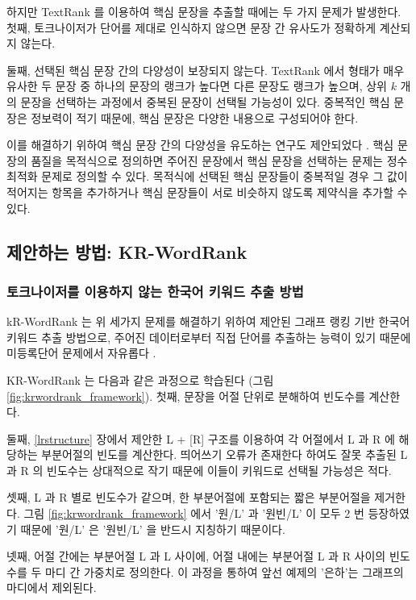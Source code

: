 \documentclass[11pt]{article}
\begin{document}
하지만 TextRank 를 이용하여 핵심 문장을 추출할 때에는 두 가지 문제가 발생한다.
첫째, 토크나이저가 단어를 제대로 인식하지 않으면 문장 간 유사도가 정확하게 계산되지 않는다.

둘째, 선택된 핵심 문장 간의 다양성이 보장되지 않는다.
TextRank 에서 형태가 매우 유사한 두 문장 중 하나의 문장의 랭크가 높다면 다른 문장도 랭크가 높으며, 상위 $k$ 개의 문장을 선택하는 과정에서 중복된 문장이 선택될 가능성이 있다.
중복적인 핵심 문장은 정보력이 적기 때문에, 핵심 문장은 다양한 내용으로 구성되어야 한다.

이를 해결하기 위하여 핵심 문장 간의 다양성을 유도하는 연구도 제안되었다 \citep{mcdonald2007study, parveen2015topical}.
핵심 문장의 품질을 목적식으로 정의하면 주어진 문장에서 핵심 문장을 선택하는 문제는 정수 최적화 문제로 정의할 수 있다.
목적식에 선택된 핵심 문장들이 중복적일 경우 그 값이 적어지는 항목을 추가하거나 핵심 문장들이 서로 비슷하지 않도록 제약식을 추가할 수 있다.


\subsection{제안하는 방법: KR-WordRank}

\subsubsection{토크나이저를 이용하지 않는 한국어 키워드 추출 방법}

kR-WordRank 는 위 세가지 문제를 해결하기 위하여 제안된 그래프 랭킹 기반 한국어 키워드 추출 방법으로, 주어진 데이터로부터 직접 단어를 추출하는 능력이 있기 때문에 미등록단어 문제에서 자유롭다 \citep{kim2014kr}.

KR-WordRank 는 다음과 같은 과정으로 학습된다 (그림 \ref{fig:krwordrank_framework}).
첫째, 문장을 어절 단위로 분해하여 빈도수를 계산한다.

둘째, \ref{lrstructure} 장에서 제안한 L + [R] 구조를 이용하여 각 어절에서 L 과 R 에 해당하는 부분어절의 빈도를 계산한다.
띄어쓰기 오류가 존재한다 하여도 잘못 추출된 L 과 R 의 빈도수는 상대적으로 작기 때문에 이들이 키워드로 선택될 가능성은 적다.

셋째, L 과 R 별로 빈도수가 같으며, 한 부분어절에 포함되는 짧은 부분어절을 제거한다.
그림 \ref{fig:krwordrank_framework} 에서 '원/L' 과 '원빈/L' 이 모두 2 번 등장하였기 때문에 '원/L' 은 '원빈/L' 을 반드시 지칭하기 때문이다.

넷째, 어절 간에는 부분어절 L 과 L 사이에, 어절 내에는 부분어절 L 과 R 사이의 빈도수를 두 마디 간 가중치로 정의한다.
이 과정을 통하여 앞선 예제의 '은하'는 그래프의 마디에서 제외된다.
\end{document}
